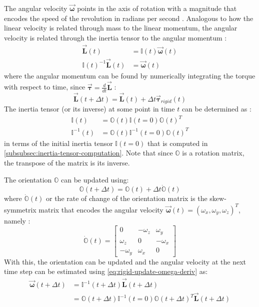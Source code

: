 \documentclass[oneside, a4paper]{book}
\newcommand\vek[1]{\vec{\bm{#1}}}
\newcommand\br[1]{\left(#1\right)}
\begin{document}
    The angular velocity $\vek{\omega}$ points in the axis of rotation with a magnitude that encodes the speed of the revolution in radians per second \autocite{physically-based-rigids}. Analogous to how the linear velocity is related through mass to the linear momentum, the angular velocity is related through the inertia tensor to the angular momentum \autocite{classical-mechanics}:
    \begin{align}
      \vek{L}\br{t} &= \mathds{I}\br{t} \vek{\omega}\br{t}\\
      \mathds{I}\br{t}^{-1} \vek{L}\br{t} &=\vek{\omega}\br{t}\label{eq:rigid-update-omega-deriv}
    \end{align}
    where the angular momentum can be found by numerically integrating the torque with respect to time, since $\vek{\tau}=\frac{d}{dt}\vek{L}$ \autocite{physically-based-rigids}:
    \begin{equation}
      \vek{L}\br{t+\Delta t} = \vek{L}\br{t} + \Delta t \vek{\tau}_{rigid}\br{t}
    \end{equation}
    The inertia tensor (or its inverse) at some point in time $t$ can be determined as \autocite{physically-based-rigids}:
    \begin{align}
      \mathds{I}\br{t} &= \mathds{O}\br{t} \mathds{I}\br{t=0} \mathds{O}\br{t}^T\\
      \mathds{I}^{-1}\br{t} &= \mathds{O}\br{t} \mathds{I}^{-1}\br{t=0} \mathds{O}\br{t}^T
    \end{align}
    in terms of the initial inertia tensor $\mathds{I}\br{t=0}$ that is computed in \autoref{subsubsec:inertia-tensor-computation}. Note that since $\mathds{O}$ is a rotation matrix, the transpose of the matrix is its inverse. 

    The orientation $\mathds{O}$ can be updated using:
    \begin{equation}\label{eq:rigid-orientation-update}
      \mathds{O}\br{t+\Delta t} = \mathds{O}\br{t} + \Delta t \dot{\mathds{O}}\br{t}
    \end{equation}
    where $\dot{\mathds{O}}\br{t}$ or the rate of change of the orientation matrix is the skew-symmetrix matrix that encodes the angular velocity $\vek{\omega}\br{t} = \br{\omega_x, \omega_y, \omega_z}^T$, namely \autocite{physically-based-rigids}:
    \begin{equation}
      \dot{\mathds{O}}\br{t} = \begin{bmatrix}
        0&-\omega_z&\omega_y\\
        \omega_z&0&-\omega_x\\
        -\omega_y&\omega_x&0
      \end{bmatrix}
    \end{equation}
    With this, the orientation can be updated and the angular velocity at the next time step can be estimated using \autoref{eq:rigid-update-omega-deriv} as:
    \begin{align}\label{eq:rigid-update-omega}
      \vek{\omega}\br{t+\Delta t} &= \mathds{I}^{-1}\br{t+\Delta t} \vek{L}\br{t+\Delta t}\\
      &= \mathds{O}\br{t+\Delta t} \mathds{I}^{-1}\br{t=0} \mathds{O}\br{t+\Delta t}^T \vek{L}\br{t+\Delta t}
    \end{align}
\end{document}
